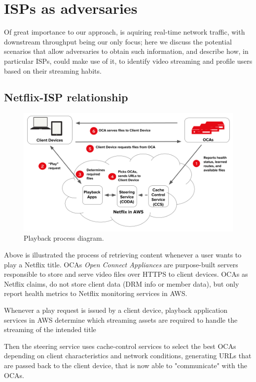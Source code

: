 \chapter{ISPs as adversaries}\label{sec:attack_isp}

Of great importance to our approach, is aquiring real-time network traffic,
with downstream throughput being our only focus; here we discuss the potential
scenarios that allow adversaries to obtain such information, and describe how,
in particular ISPs, could make use of it, to identify video streaming and
profile users based on their streaming habits.

\section{Netflix-ISP relationship}

\begin{figure}[!htb]
  \centering
  \includegraphics[width=\columnwidth]{img/playback.png}
  \caption{Playback process diagram. \cite{netflix_oca}}
  \label{fig:playback}
\end{figure}

Above is illustrated the process of retrieving content whenever a user wants to
play a Netflix title. OCAs \emph{Open Connect Appliances} are purpose-built
servers responsible to store and serve video files over HTTPS to client
devices.  OCAs as Netflix claims, do not store client data (DRM info or member
data), but only report health metrics to Netflix monitoring services in AWS.

Whenever a play request is issued by a client device, playback application
services in AWS determine which streaming assets are required to handle the
streaming of the intended title

Then the steering service uses cache-control services to select the best OCAs
depending on client characteristics and network conditions, generating URLs
that are passed back to the client device, that is now able to "communicate"
with the OCAs.

